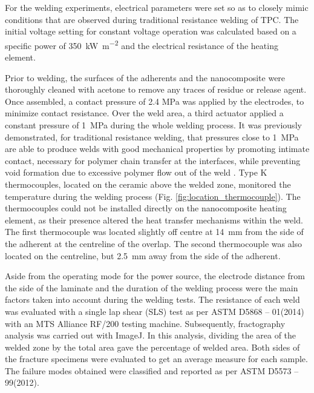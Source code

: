 \documentclass[11pt,review,times]{elsarticle}
\begin{document}
For the welding experiments, electrical parameters were set so as to closely mimic conditions that are observed during traditional resistance welding of TPC. 
The initial voltage setting for constant voltage operation was calculated based on a specific power of \SI{350}{\kW\per\square\metre} and the electrical resistance of the heating element. 

Prior to welding, the surfaces of the adherents and the nanocomposite were thoroughly cleaned with acetone to remove any traces of residue or release agent. 
Once assembled, a contact pressure of 2.4 MPa was applied by the electrodes, to minimize contact resistance. 
Over the weld area, a third actuator applied a constant pressure of \SI{1}{\MPa} during the whole welding process. 
It was previously demonstrated, for traditional resistance welding, that pressures close to \SI{1}{\MPa} are able to produce welds with good mechanical properties by promoting intimate contact, necessary for polymer chain transfer at the interfaces, while preventing void formation due to excessive polymer flow out of the weld \cite{Ageorges2000a, Dube2007, Shi2014}. 
Type K thermocouples, located on the ceramic above the welded zone, monitored the temperature during the welding process (Fig. \ref{fig:location_thermocouple}). 
The thermocouples could not be installed directly on the nanocomposite heating element, as their presence altered the heat transfer mechanisms within the weld. 
The first thermocouple was located slightly off centre at \SI{14}{\milli\metre} from the side of the adherent at the centreline of the overlap. 
The second thermocouple was also located on the centreline, but \SI{2.5}{\milli\metre} away from the side of the adherent.  

Aside from the operating mode for the power source, the electrode distance from the side of the laminate and the duration of the welding process were the main factors taken into account during the welding tests. 
The resistance of each weld was evaluated with a single lap shear (SLS) test as per ASTM D5868 – 01(2014) with an MTS Alliance RF/200 testing machine. 
Subsequently, fractography analysis was carried out with ImageJ. 
In this analysis, dividing the area of the welded zone by the total area gave the percentage of welded area. 
Both sides of the fracture specimens were evaluated to get an average measure for each sample. 
The failure modes obtained were classified and reported as per ASTM D5573 – 99(2012). 

\FloatBarrier
\end{document}

